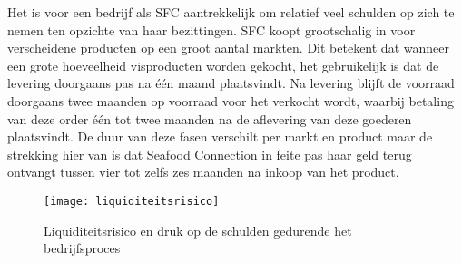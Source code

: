 \label{beschr:activiteiten}
Het is voor een bedrijf als SFC aantrekkelijk om relatief veel schulden op zich te nemen ten opzichte van haar bezittingen. SFC koopt grootschalig in voor verscheidene producten op een groot aantal markten. Dit betekent dat wanneer een grote hoeveelheid visproducten worden gekocht, het gebruikelijk is dat de levering doorgaans pas na één maand plaatsvindt. Na levering blijft de voorraad doorgaans twee maanden op voorraad voor het verkocht wordt, waarbij betaling van deze order één tot twee maanden na de aflevering van deze goederen plaatsvindt. De duur van deze fasen verschilt per markt en product maar de strekking hier van is dat Seafood Connection in feite pas haar geld terug ontvangt tussen vier tot zelfs zes maanden na inkoop van het product. \citep{quickscan}

\begin{figure}[!h]
    \centering
    \texttt{[image: liquiditeitsrisico]}
    \caption{Liquiditeitsrisico en druk op de schulden gedurende het bedrijfsproces}
    \label{fig:liquiditeitsrisico}
\end{figure}